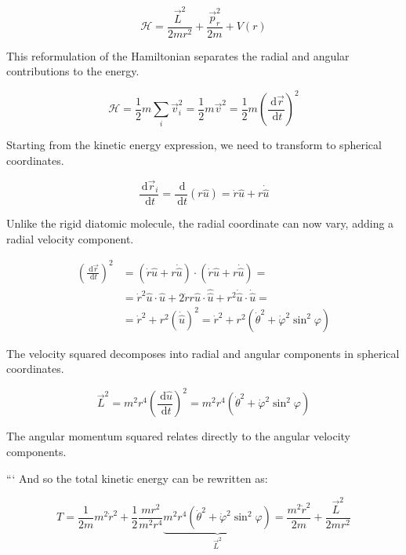 \documentclass[italian]{HKNdocument}
\begin{document}
\begin{equation*}
\mathcal{H}=\frac{\vec{L}^{2}}{2 m r^{2}}+\frac{\vec{p}_{r}^{2}}{2 m}+V(r) \tag{9.3}
\end{equation*}

This reformulation of the Hamiltonian separates the radial and angular contributions to the energy.

\begin{equation*}
\mathcal{H}=\frac{1}{2} m \sum_{i} \vec{v}_{i}^{2}=\frac{1}{2} m \vec{v}^{2}=\frac{1}{2} m\left(\frac{\mathrm{~d} \vec{r}}{\mathrm{~d} t}\right)^{2} \tag{9.4}
\end{equation*}

Starting from the kinetic energy expression, we need to transform to spherical coordinates.

\begin{equation*}
\frac{\mathrm{~d} \vec{r}_{i}}{\mathrm{~d} t}=\frac{\mathrm{~d}}{\mathrm{~d} t}(r \hat{u})=\dot{r} \hat{u}+r \dot{\hat{u}} \tag{9.5}
\end{equation*}

Unlike the rigid diatomic molecule, the radial coordinate can now vary, adding a radial velocity component.

\begin{align*}
\left(\frac{\mathrm{~d} \vec{r}}{\mathrm{~d} t}\right)^{2} & =(\dot{r} \hat{u}+r \dot{\hat{u}}) \cdot(\dot{r} \hat{u}+r \dot{\hat{u}})= \\
& =\dot{r}^{2} \hat{u} \cdot \hat{u}+2 \dot{r} r \hat{u} \cdot \hat{\hat{u}}+r^{2} \dot{\hat{u}} \cdot \dot{\hat{u}}=  \tag{9.6}\\
& =\dot{r}^{2}+r^{2}(\dot{\hat{u}})^{2}=\dot{r}^{2}+r^{2}\left(\dot{\theta}^{2}+\dot{\varphi}^{2} \sin ^{2} \varphi\right)
\end{align*}

The velocity squared decomposes into radial and angular components in spherical coordinates.

\begin{equation*}
\vec{L}^{2}=m^{2} r^{4}\left(\frac{\mathrm{~d} \hat{u}}{\mathrm{~d} t}\right)^{2}=m^{2} r^{4}\left(\dot{\theta}^{2}+\dot{\varphi}^{2} \sin ^{2} \varphi\right) \tag{9.7}
\end{equation*}

The angular momentum squared relates directly to the angular velocity components.

```
And so the total kinetic energy can be rewritten as:

\begin{equation*}
T=\frac{1}{2 m} m^{2} \dot{r}^{2}+\frac{1}{2} \frac{m r^{2}}{m^{2} r^{4}} \underbrace{m^{2} r^{4}\left(\dot{\theta}^{2}+\dot{\varphi}^{2} \sin ^{2} \varphi\right)}_{\vec{L}^{2}}=\frac{m^{2} \dot{r}^{2}}{2 m}+\frac{\vec{L}^{2}}{2 m r^{2}} \tag{9.8}
\end{equation*}
\end{document}
